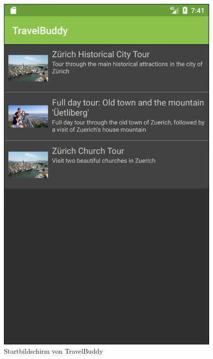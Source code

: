 \documentclass[a4paper,10pt,xetex]{article}
\begin{document}
\begin{figure}
  \centering
  \begin{minipage}[b]{0.48\textwidth}
    \includegraphics[width=\textwidth]{screenshots/ListActivity}
    \caption{Startbildschirm von TravelBuddy}
    \label{fig:list-activity}
  \end{minipage}
  \hfill
  \begin{minipage}[b]{0.48\textwidth}

\end{minipage}
\end{figure}
\end{document}

